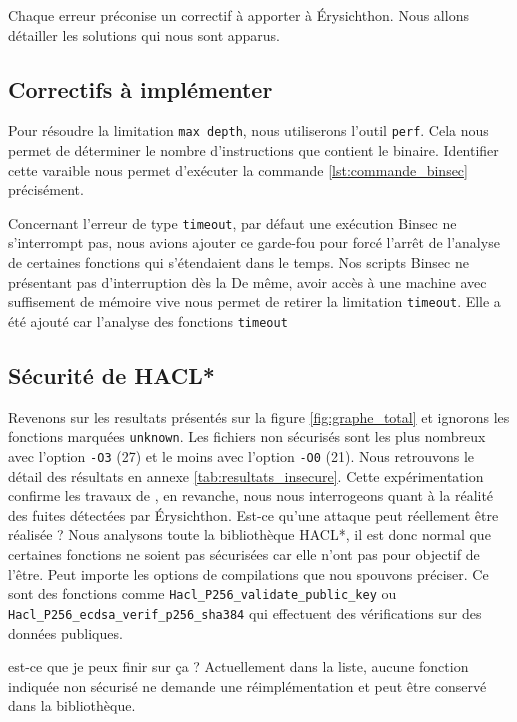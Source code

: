 Chaque erreur préconise un correctif à apporter à Érysichthon. Nous allons détailler les solutions qui nous sont apparus.

\subsection*{Correctifs à implémenter}

Pour résoudre la limitation \texttt{max depth}, nous utiliserons l'outil \texttt{perf}. Cela nous permet de déterminer le nombre d'instructions que contient le binaire. Identifier cette varaible nous permet d'exécuter la commande \ref{lst:commande_binsec} précisément.

Concernant l'erreur de type \texttt{timeout}, par défaut une exécution Binsec ne s'interrompt pas, nous avions ajouter ce garde-fou pour forcé l'arrêt de l'analyse de certaines fonctions qui s'étendaient dans le temps. Nos scripts Binsec ne présentant pas d'interruption dès la 
De même, avoir accès à une machine avec suffisement de mémoire vive nous permet de retirer la limitation \texttt{timeout}. Elle a été ajouté car l'analyse des fonctions \texttt{timeout}

\subsection*{Sécurité de HACL*}

Revenons sur les resultats présentés sur la figure \ref{fig:graphe_total} et ignorons les fonctions marquées \texttt{unknown}. Les fichiers non sécurisés sont les plus nombreux avec l'option \texttt{-O3} (27) et le moins avec l'option \texttt{-O0} (21). Nous retrouvons le détail des résultats en annexe \ref{tab:resultats_insecure}. Cette expérimentation confirme les travaux de \citeauthor{schneider2024breakingbadcompilersbreak}, en revanche, nous nous interrogeons quant à la réalité des fuites détectées par Érysichthon. Est-ce qu'une attaque peut réellement être réalisée ?\smallbreak
Nous analysons toute la bibliothèque HACL*, il est donc normal que certaines fonctions ne soient pas sécurisées car elle n'ont pas pour objectif de l'être. Peut importe les options de compilations que nou spouvons préciser. Ce sont des fonctions comme \texttt{Hacl\_P256\_\-vali\-date\_public\_key} ou \texttt{Hacl\_P256\_\-ecdsa\_\-verif\_p256\_sha384} qui effectuent des vérifications sur des données publiques. 

\begin{CitationBox}{est-ce que je peux finir sur ça ?}
  Actuellement dans la liste, aucune fonction indiquée non sécurisé ne demande une réimplémentation et peut être conservé dans la bibliothèque.
\end{CitationBox}


